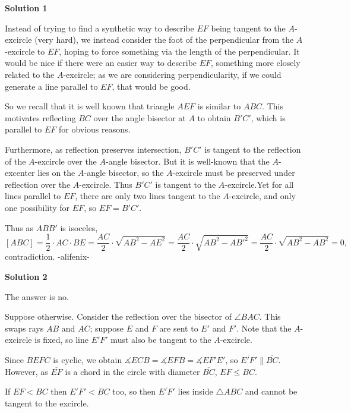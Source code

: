 \begin{enumerate}
 



\textbf{Solution 1}

Instead of trying to find a synthetic way to describe $EF$ being tangent to the $A$-excircle (very hard), we instead consider the foot of the perpendicular from the $A$-excircle to $EF$, hoping to force something via the length of the perpendicular.  It would be nice if there were an easier way to describe $EF$, something more closely related to the $A$-excircle; as we are considering perpendicularity, if we could generate a line parallel to $EF$, that would be good.  

 So we recall that it is well known that triangle $AEF$ is similar to $ABC$.  This motivates reflecting $BC$ over the angle bisector at $A$ to obtain $B'C'$, which is parallel to $EF$ for obvious reasons.  

 Furthermore, as reflection preserves intersection, $B'C'$ is tangent to the reflection of the $A$-excircle over the $A$-angle bisector.  But it is well-known that the $A$-excenter lies on the $A$-angle bisector, so the $A$-excircle must be preserved under reflection over the $A$-excircle.  Thus $B'C'$ is tangent to the $A$-excircle.Yet for all lines parallel to $EF$, there are only two lines tangent to the $A$-excircle, and only one possibility for $EF$,  so $EF = B'C'$.  

 Thus as $ABB'$ is isoceles, 
 \[[ABC] = \frac{1}{2} \cdot AC \cdot BE = \frac{AC}{2} \cdot \sqrt{AB^2 - AE^2} = \frac{AC}{2} \cdot \sqrt{AB^2 - AB'^2} = \frac{AC}{2} \cdot \sqrt{AB^2 - AB^2} = 0,\] contradiction. -alifenix-

 



\textbf{Solution 2}

The answer is no.

 Suppose otherwise. Consider the reflection over the bisector of $\angle BAC$. This swaps rays $AB$ and $AC$; suppose $E$ and $F$ are sent to $E'$ and $F'$. Note that the $A$-excircle is fixed, so line $E'F'$ must also be tangent to the $A$-excircle.

 Since $BEFC$ is cyclic, we obtain $\measuredangle ECB = \measuredangle EFB = \measuredangle EF'E'$, so $\overline{E'F'} \parallel \overline{BC}$. However, as $\overline{EF}$ is a chord in the circle with diameter $\overline{BC}$, $EF \le BC$.

 If $EF < BC$ then $E'F' < BC$ too, so then $\overline{E'F'}$ lies inside $\triangle ABC$ and cannot be tangent to the excircle.


\end{enumerate}
